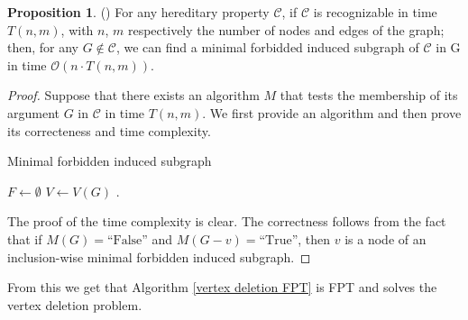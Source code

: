 \documentclass{article}
\theoremstyle{definition}
\newtheorem{prop}[thm]{Proposition}
\begin{document}
    \begin{prop} \label{FPT-prop_1} (\cite{FPT-algos})
        For any hereditary property $\mathcal{C}$,
        if $\mathcal{C}$ is recognizable
        in time $T\left(n, m\right)$, with
        $n$, $m$ respectively the number of nodes and edges
        of the graph; then, for any $G \not \in \mathcal{C}$,
        we can find a minimal forbidded induced
        subgraph of $\mathcal{C}$ in G in time 
        $\mathcal{O} \left(n \cdot T\left(n, m\right)\right)$.  \end{prop}
    \begin{proof} 
        Suppose that there exists an algorithm $M$ that tests
        the membership of its argument $G$ in $\mathcal{C}$ in time
        $T\left(n, m\right)$.
        We first provide an algorithm and then prove its correcteness
        and time complexity.

        \begin{algorithm} \label{forbid subgraph}
            \caption{Minimal forbidden induced subgraph}
           

            $F \gets \emptyset$\;
            $V \gets V\left(G\right)$\;
            .
        \end{algorithm}
    The proof of the time complexity is clear.  
    The correctness follows from the fact that if
    $M\left(G\right) = \text{``False''}$ and $M\left(G - v\right) = \text{``True''}$,
    then $v$ is a node of an inclusion-wise minimal forbidden induced subgraph.
    \end{proof}
    
    From this we get that Algorithm \ref{vertex deletion FPT}
    is FPT and solves the vertex deletion problem. 
    
\end{document}
